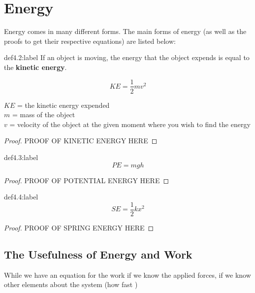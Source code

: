 \section{Energy}

Energy comes in many different forms. The main forms of energy (as well as the proofs to get their respective equations) are listed below:


\begin{definition}{def4.2:label}
    If an object is moving, the energy that the object expends is equal to the \textbf{kinetic energy}. 

    $$
    KE = \frac{1}{2}mv^2
    $$

    $KE$ = the kinetic energy expended\\
    $m$ = mass of the object\\
    $v$ = velocity of the object at the given moment where you wish to find the energy
\end{definition}

\begin{proof}
    PROOF OF KINETIC ENERGY HERE
\end{proof}


\begin{definition}{def4.3:label}
    $$
    PE = mgh
    $$
\end{definition}

\begin{proof}
    PROOF OF POTENTIAL ENERGY HERE
\end{proof}

\begin{definition}{def4.4:label}
    $$
    SE = \frac{1}{2}kx^2
    $$
\end{definition}

\begin{proof}
    PROOF OF SPRING ENERGY HERE
\end{proof}


\subsection{The Usefulness of Energy and Work}

While we have an equation for the work if we know the applied forces, if we know other elements about the system (how fast )
